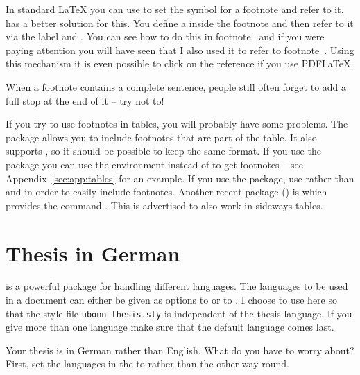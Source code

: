 In standard \LaTeX{} you can use
 to set the symbol for a
footnote and refer to it. \KOMAScript{} has a better solution for
this. You define a  inside the footnote and
then refer to it via the label and . You
can see how to do this in footnote~ and if you were
paying attention you will have seen that I also used it to refer to
footnote~. Using this mechanism it is even
possible to click on the reference if you use PDF\LaTeX.

When a footnote contains a complete sentence, people still often
forget to add a full stop at the end of it -- try not to!

If you try to use footnotes in tables, you will probably have some
problems. The  package allows you to include footnotes
that are part of the table. It also supports , so it
should be possible to keep the same format. If you use the package
 you can use the environment  
instead of  to get footnotes
-- see Appendix~\ref{sec:app:tables} for an example. 
If you use the  package, use 
rather than  and  in order to easily include
footnotes.
Another recent package () is
 which provides the command
. This is advertised to also work in sideways tables.


\section{Thesis in German}
\label{sec:layout:german}

 is a powerful package for handling different
languages. The languages to be used in a document can either be given
as options to  or to . I choose to
use  here so that the style file
\texttt{ubonn-thesis.sty} is independent of the thesis language. If
you give more than one language make sure that the default language
comes last.

Your thesis is in German rather than English. What do you have to
worry about? First, set the languages in the  to
 rather than the other way round.

